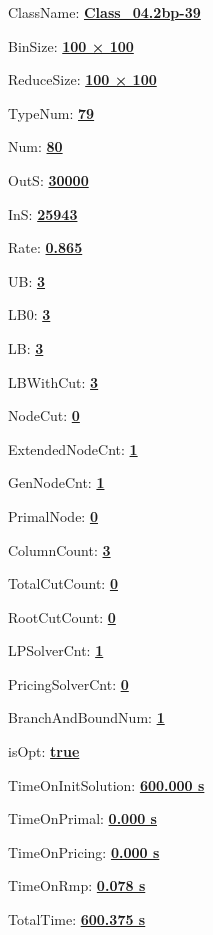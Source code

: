 \documentclass[11pt]{article}
\begin{document}
\pagestyle{empty}


ClassName: \underline{\textbf{Class_04.2bp-39}}
\par
BinSize: \underline{\textbf{100 × 100}}
\par
ReduceSize: \underline{\textbf{100 × 100}}
\par
TypeNum: \underline{\textbf{79}}
\par
Num: \underline{\textbf{80}}
\par
OutS: \underline{\textbf{30000}}
\par
InS: \underline{\textbf{25943}}
\par
Rate: \underline{\textbf{0.865}}
\par
UB: \underline{\textbf{3}}
\par
LB0: \underline{\textbf{3}}
\par
LB: \underline{\textbf{3}}
\par
LBWithCut: \underline{\textbf{3}}
\par
NodeCut: \underline{\textbf{0}}
\par
ExtendedNodeCnt: \underline{\textbf{1}}
\par
GenNodeCnt: \underline{\textbf{1}}
\par
PrimalNode: \underline{\textbf{0}}
\par
ColumnCount: \underline{\textbf{3}}
\par
TotalCutCount: \underline{\textbf{0}}
\par
RootCutCount: \underline{\textbf{0}}
\par
LPSolverCnt: \underline{\textbf{1}}
\par
PricingSolverCnt: \underline{\textbf{0}}
\par
BranchAndBoundNum: \underline{\textbf{1}}
\par
isOpt: \underline{\textbf{true}}
\par
TimeOnInitSolution: \underline{\textbf{600.000 s}}
\par
TimeOnPrimal: \underline{\textbf{0.000 s}}
\par
TimeOnPricing: \underline{\textbf{0.000 s}}
\par
TimeOnRmp: \underline{\textbf{0.078 s}}
\par
TotalTime: \underline{\textbf{600.375 s}}
\par
\newpage
\end{document}
